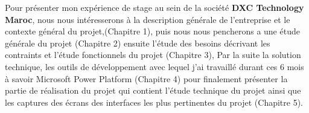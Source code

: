 Pour présenter mon expérience de stage au sein de la société \textbf{DXC Technology Maroc}, nous
nous intéresserons à la description générale de l’entreprise et le contexte général du projet,(Chapitre 1), puis nous nous pencherons a une étude générale du projet (Chapitre 2) ensuite l’étude des besoins décrivant les contraints et l’étude fonctionnels du projet (Chapitre 3), Par la suite la solution technique, les outils de développement avec lequel j’ai travaillé durant ces 6 mois à savoir Microsoft Power Platform (Chapitre 4) pour finalement présenter la partie de réalisation du projet qui contient l’étude technique du projet ainsi que les captures des écrans des interfaces les plus pertinentes du projet (Chapitre 5).


\newpage